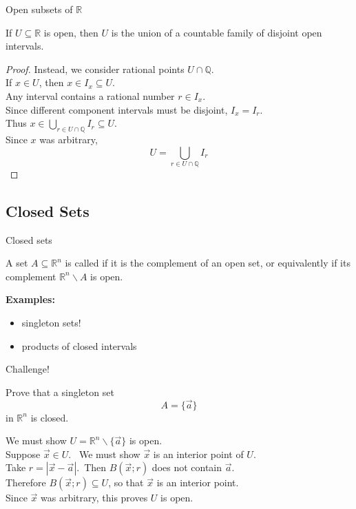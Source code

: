 \documentclass{beamer}
\begin{document}
\begin{frame}{Open subsets of $\mathbb{R}$}
\begin{thm}
If $U\subseteq\mathbb{R}$ is open, then $U$ is the union of a countable family of disjoint open intervals.
\end{thm}
\begin{proof}
Instead, we consider rational points $U\cap\mathbb{Q}$.\\
\pause
If $x\in U$, then $x\in I_x\subseteq U$.\\
\pause
Any interval contains a rational number $r\in I_x$.\\
\pause
Since different component intervals must be disjoint, $I_x=I_r$.\\
\pause
Thus $x\in \bigcup_{r\in U\cap\mathbb{Q}} I_r\subseteq U$.\\
\pause
Since $x$ was arbitrary, 
$$U= \bigcup_{r\in U\cap\mathbb{Q}} I_r$$
\end{proof}
\end{frame}

\subsection{Closed Sets}

\begin{frame}{Closed sets}
\begin{defn}
A set $A\subseteq\mathbb{R}^n$ is called  if it is the complement of an open set, or equivalently if its complement $\mathbb{R}^n\backslash A$ is open.
\end{defn}
\pause
\textbf{Examples:}
\begin{itemize}
\pause
\item singleton sets!
\pause
\item products of closed intervals
\end{itemize}
\end{frame}

\begin{frame}{Challenge!}
\begin{prob}
Prove that a singleton set
$$A = \{\vec a\}$$
in $\mathbb{R}^n$ is closed.
\end{prob}
\pause
\begin{soln}
We must show $U = \mathbb{R}^n\backslash\{\vec a\}$ is open.\\\pause
Suppose $\vec x\in U$.\ \pause
We must show $\vec x$ is an interior point of $U$.\\\pause
Take $r = |\vec x-\vec a|$.\ \pause Then $B(\vec x; r)$ does not contain $\vec a$.\\\pause
Therefore $B(\vec x; r)\subseteq U$, so that $\vec x$ is an interior point.\\\pause
Since $\vec x$ was arbitrary, this proves $U$ is open.
\end{soln}
\end{frame}
\end{document}
